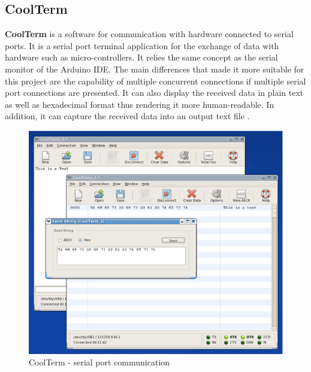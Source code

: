 \documentclass[12pt,a4paper]{report}
\begin{document}
\subsection{CoolTerm}
\textbf{CoolTerm} is a software for communication with hardware connected to serial ports.
It is a serial port terminal application for the exchange of data with hardware such as micro-controllers.
It relies the same concept as the serial monitor of the Arduino IDE.
The main differences that made it more suitable for this project are the capability of multiple concurrent connections if multiple serial port connections are presented.
It can also display the received data in plain text as well as hexadecimal format thus rendering it more human-readable.
In addition, it can capture the received data into an output text file \cite{website:coolterm}.
\begin{figure}[H]
\centering
    \includegraphics*[scale=0.3]{cooltermtinux}
    \caption{CoolTerm - serial port communication}
\end{figure}
\ \\
%
\end{document}

